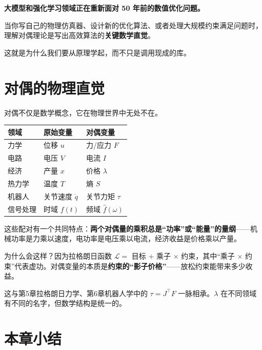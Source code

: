 \begin{insightbox}
\textbf{大模型和强化学习领域正在重新面对 50 年前的数值优化问题。}

当你写自己的物理仿真器、设计新的优化算法、或者处理大规模约束满足问题时，理解对偶理论是写出高效算法的\textbf{关键数学直觉}。

这就是为什么我们要从原理学起，而不只是调用现成的库。
\end{insightbox}

\section{对偶的物理直觉}

对偶不仅是数学概念，它在物理世界中无处不在。

\begin{center}
\renewcommand{\arraystretch}{1.4}
\begin{tabular}{lll}
\toprule
\textbf{领域} & \textbf{原始变量} & \textbf{对偶变量} \\
\midrule
力学 & 位移 $u$ & 力/应力 $F$ \\
电路 & 电压 $V$ & 电流 $I$ \\
经济 & 产量 $x$ & 价格 $\lambda$ \\
热力学 & 温度 $T$ & 熵 $S$ \\
机器人 & 关节速度 $\dot{q}$ & 关节力矩 $\tau$ \\
信号处理 & 时域 $f(t)$ & 频域 $\hat{f}(\omega)$ \\
\bottomrule
\end{tabular}
\end{center}

这些配对有一个共同特点：\textbf{两个对偶量的乘积总是“功率”或“能量”的量纲}——机械功率是力乘以速度，电功率是电压乘以电流，经济收益是价格乘以产量。

\begin{physicalmeaning}
为什么会这样？因为拉格朗日函数 $\mathcal{L} = $ 目标 $+$ 乘子 $\times$ 约束，其中“乘子 $\times$ 约束”代表虚功。对偶变量的本质是\textbf{约束的“影子价格”}——放松约束能带来多少收益。

这与第5章拉格朗日力学、第6章机器人学中的 $\tau = J^\top F$ 一脉相承。$\lambda$ 在不同领域有不同的名字，但数学结构是统一的。
\end{physicalmeaning}

\section{本章小结}

